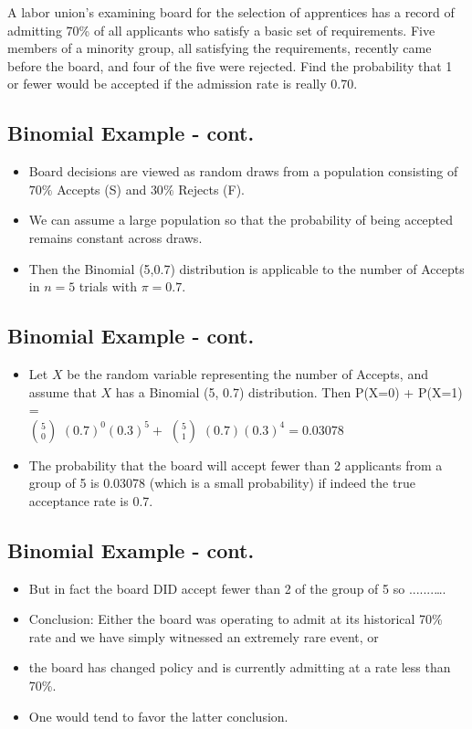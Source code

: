 \documentclass[
  letterpaper,
  DIV=11,
  numbers=noendperiod]{scrartcl}
\begin{document}
A labor union's examining board for the selection of apprentices has a
record of admitting 70\% of all applicants who satisfy a basic set of
requirements. Five members of a minority group, all satisfying the
requirements, recently came before the board, and four of the five were
rejected. Find the probability that 1 or fewer would be accepted if the
admission rate is really 0.70.

\subsection{Binomial Example - cont.}\label{binomial-example---cont.}

\begin{itemize}
\item
  Board decisions are viewed as random draws from a population
  consisting of \(70\%\) Accepts (S) and \(30\%\) Rejects (F).
\item
  We can assume a large population so that the probability of being
  accepted remains constant across draws.
\item
  Then the Binomial (5,0.7) distribution is applicable to the number of
  Accepts in \(n=5\) trials with \(\pi=0.7\).
\end{itemize}

\subsection{Binomial Example - cont.}\label{binomial-example---cont.-1}

\begin{itemize}
\item
  Let \(X\) be the random variable representing the number of Accepts,
  and assume that \(X\) has a Binomial (5, 0.7) distribution. Then
  P(X=0) + P(X=1) =\\
  \({5}\choose{0}\) \((0.7)^0(0.3)^5+\) \({5}\choose{1}\)
  \((0.7)(0.3)^4=0.03078\)
\item
  The probability that the board will accept fewer than 2 applicants
  from a group of 5 is 0.03078 (which is a small probability) {if indeed
  the true acceptance rate is 0.7.}
\end{itemize}

\subsection{Binomial Example - cont.}\label{binomial-example---cont.-2}

\begin{itemize}
\item
  But in fact the board DID accept fewer than 2 of the group of 5 so
  .......\ldots.
\item
  {Conclusion:} Either the board was operating to admit at its
  historical 70\% rate and we have simply witnessed an extremely rare
  event, {or}
\item
  the board has changed policy and is currently admitting at a rate less
  than 70\%.
\item
  One would tend to favor the latter conclusion.
\end{itemize}
\end{document}
